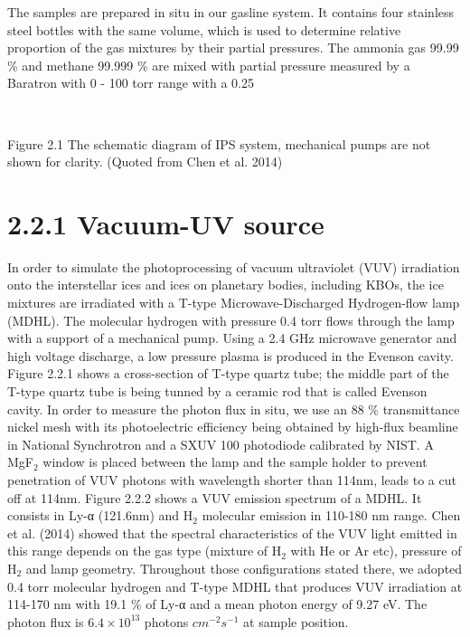 The samples are prepared in situ in our gasline system. It contains four stainless steel bottles with the same volume, which is used to determine relative proportion of the gas mixtures by their partial pressures. The ammonia gas 99.99 \% and methane 99.999 \% are mixed with partial pressure measured by a Baratron with 0 - 100 torr range with a 0.25%


 

Figure 2.1 The schematic diagram of IPS system, mechanical pumps are not shown for clarity. (Quoted from Chen et al. 2014)
\section{2.2.1 Vacuum-UV source}

In order to simulate the photoprocessing of vacuum ultraviolet (VUV) irradiation onto the interstellar ices and ices on planetary bodies, including KBOs, the ice mixtures are irradiated with a T-type Microwave-Discharged Hydrogen-flow lamp (MDHL). The molecular hydrogen with pressure 0.4 torr flows through the lamp with a support of a mechanical pump. Using a 2.4 GHz microwave generator and high voltage discharge, a low pressure plasma is produced in the Evenson cavity. Figure 2.2.1 shows a cross-section of T-type quartz tube; the middle part of the T-type quartz tube is being tunned by a ceramic rod that is called Evenson cavity.  In order to measure the photon flux in situ, we use an 88 \% transmittance nickel mesh with its photoelectric efficiency being obtained by high-flux beamline in National Synchrotron and a SXUV 100 photodiode calibrated by NIST. A MgF$_2$ window is placed between the lamp and the sample holder to prevent penetration of VUV photons with wavelength shorter than 114nm, leads to a cut off at 114nm. Figure 2.2.2 shows a VUV emission spectrum of a MDHL. It consists in Ly-α (121.6nm) and H$_2$ molecular emission in 110-180 nm range. Chen et al. (2014) showed that the spectral characteristics of the VUV light emitted in this range depends on the gas type (mixture of H$_2$ with He or Ar etc), pressure of H$_2$ and lamp geometry. Throughout those configurations stated there, we adopted 0.4 torr molecular hydrogen and T-type MDHL that produces VUV irradiation at 114-170 nm with 19.1 \% of Ly-α and a mean photon energy of 9.27 eV. The photon flux is $6.4 \times 10^{13}$ photons $cm^{-2} s^{-1}$ at sample position.


